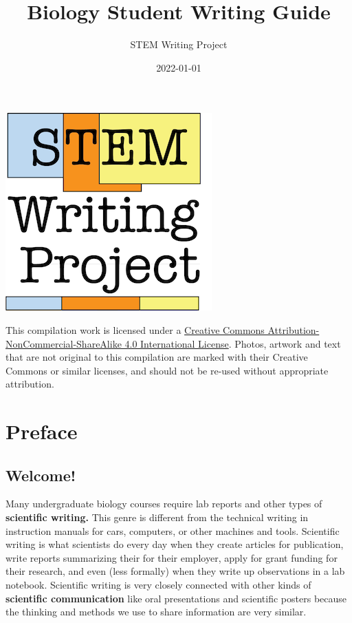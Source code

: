 \documentclass[
]{book}
\title{Biology Student Writing Guide}
\author{STEM Writing Project}
\date{2022-01-01}
\begin{document}
\maketitle

{
\setcounter{tocdepth}{1}
\tableofcontents
}
\hypertarget{section}{%
\chapter*{}\label{section}}

\includegraphics{images/SWP_logo.png}

This compilation work is licensed under a \href{http://creativecommons.org/licenses/by-nc-sa/4.0/}{Creative Commons Attribution-NonCommercial-ShareAlike 4.0 International License}. Photos, artwork and text that are not original to this compilation are marked with their Creative Commons or similar licenses, and should not be re-used without appropriate attribution.

\hypertarget{preface}{%
\chapter*{Preface}\label{preface}}

\hypertarget{welcome}{%
\section*{Welcome!}\label{welcome}}

Many undergraduate biology courses require lab reports and other types of \textbf{scientific writing.} This genre is different from the technical writing in instruction manuals for cars, computers, or other machines and tools. Scientific writing is what scientists do every day when they create articles for publication, write reports summarizing their for their employer, apply for grant funding for their research, and even (less formally) when they write up observations in a lab notebook. Scientific writing is very closely connected with other kinds of \textbf{scientific communication} like oral presentations and scientific posters because the thinking and methods we use to share information are very similar.
\end{document}
